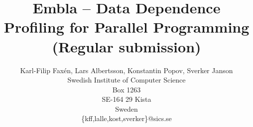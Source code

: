 \documentclass[11pt]{article}
\begin{document}
\begin{titlepage}

\title{Embla -- Data Dependence Profiling for Parallel Programming \\
  \Large (Regular submission)}
\author{Karl-Filip Fax\'en, Lars Albertsson, Konstantin Popov, Sverker Janson\\
       Swedish Institute of Computer Science\\
       Box 1263\\
       SE-164 29 Kista\\
       Sweden\\
       \{kff,lalle,kost,sverker\}@sics.se}
\date{}
\maketitle
\thispagestyle{empty}


\end{titlepage}





%






\end{document}

